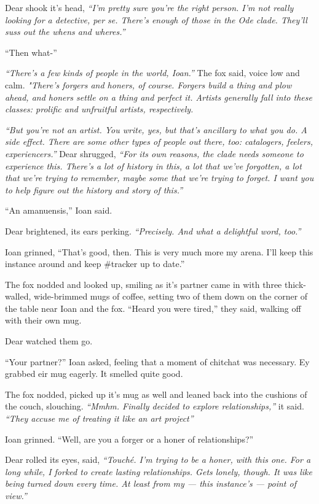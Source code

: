 Dear shook it's head, \emph{``I'm pretty sure you're the right person. I'm not really looking for a detective, per se. There's enough of those in the Ode clade. They'll suss out the whens and wheres.''}

``Then what-''

\emph{``There's a few kinds of people in the world, Ioan.''} The fox said, voice low and calm. \emph{"There's forgers and honers, of course. Forgers build a thing and plow ahead, and honers settle on a thing and perfect it. Artists generally fall into these classes: prolific and unfruitful artists, respectively.}

\emph{``But you're not an artist. You write, yes, but that's ancillary to what you do. A side effect. There are some other types of people out there, too: catalogers, feelers, experiencers.''} Dear shrugged, \emph{``For its own reasons, the clade needs someone to experience this. There's a lot of history in this, a lot that we've forgotten, a lot that we're trying to remember, maybe some that we're trying to forget. I want you to help figure out the history and story of this.''}

``An amanuensis,'' Ioan said.

Dear brightened, its ears perking. \emph{``Precisely. And what a delightful word, too.''}

Ioan grinned, ``That's good, then. This is very much more my arena. I'll keep this instance around and keep \#tracker up to date.''

The fox nodded and looked up, smiling as it's partner came in with three thick-walled, wide-brimmed mugs of coffee, setting two of them down on the corner of the table near Ioan and the fox. ``Heard you were tired,'' they said, walking off with their own mug.

Dear watched them go.

``Your partner?'' Ioan asked, feeling that a moment of chitchat was necessary. Ey grabbed eir mug eagerly. It smelled quite good.

The fox nodded, picked up it's mug as well and leaned back into the cushions of the couch, slouching. \emph{``Mmhm. Finally decided to explore relationships,''} it said. \emph{``They accuse me of treating it like an art project''}

Ioan grinned. ``Well, are you a forger or a honer of relationships?''

Dear rolled its eyes, said, \emph{``Touché. I'm trying to be a honer, with this one. For a long while, I forked to create lasting relationships. Gets lonely, though. It was like being turned down every time. At least from my --- this instance's --- point of view.''}

